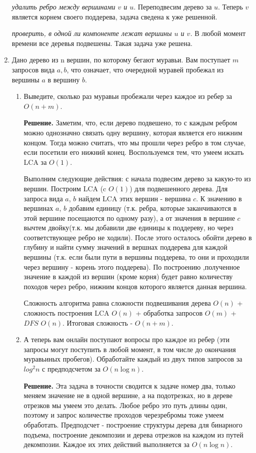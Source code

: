 \begin{enumerate}
	\textit{удалить ребро между вершинами $v$ и $u$}. Переподвесим дерево за $u$. Теперь $v$ 
	является корнем своего поддерева, задача сведена к уже решенной.
	
	\textit{проверить, в одной ли компоненте лежат вершины $u$ и $v$.} В любой момент времени 
	все деревья подвешены. Такая задача уже решена.
	
	
	\item Дано дерево из n вершин, по которому бегают муравьи. Вам поступает $m$
	запросов вида $a, b$, что означает, что очередной муравей пробежал из вершины $a$ в вершину 
	$b$.
	
	\begin{enumerate}
		\item Выведите, сколько раз муравьи пробежали через каждое из ребер за $O(n + m)$.
		
		\textbf{Решение. } Заметим, что, если дерево подвешено, то с каждым ребром можно 
		однозначно связать одну вершину, которая является его нижним концом. Тогда можно 
		считать, что мы прошли через ребро в том случае, если посетили его нижний конец. 
		Воспользуемся тем, что умеем искать LCA за $O(1)$. 
		
		Выполним следующие действия: с начала подвесим дерево за какую-то из вершин. Построим 
		LCA (c $O(1)$) для подвешенного дерева. Для запроса вида $a$, $b$ найдем LCA этих 
		вершин - вершина $c$. К значению в вершинах $a$, $b$ добавим единицу (т.к. ребра, 
		которые заканчиваются в этой вершине посещаются по одному разу), а от значения в 
		вершине $c$ вычтем двойку(т.к. мы добавили две единицы к поддереву, но через 
		соответствующее ребро не ходили). После этого осталось обойти дерево в глубину и найти 
		сумму значений в вершнах поддерева для каждой вершины (т.к. если были пути в вершины 
		поддерева, то они и проходили через вершину - корень этого поддерева). По построению 
		,полученное значение в каждой из вершин (кроме корня) будет равно количеству походов 
		через ребро, 
		нижним концов которого является данная вершина.
		
		Сложность алгоритма равна сложности подвешивания дерева $O(n)$ + сложность построения 
		LCA $O(n)$ + обработка запросов $O(m)$ + $DFS$ $O(n)$. Итоговая сложность - $O(n + m)$.
	
		\item А теперь вам онлайн поступают вопросы про каждое из ребер (эти запросы могут 
		поступить в любой момент, в том числе до окончания муравьиных пробегов). Обработайте 
		каждый из двух типов запросов за $log^2 n$ с предподсчетом за $O(n \log n)$.
		
		\textbf{Решение. } Эта задача в точности сводится к задаче номер два, только меняем 
		значение не в одной вершине, а на подотрезках, но в дереве отрезков мы умеем это делать. 
		Любое ребро это путь длины один, поэтому и запрос количестве проходов черезребромы тоже 
		умеем обработать. Предподсчет - построение структуры дерева для бинарного подъема, 
		построение декомпозии и дерева отрезков на каждом из путей декомпозии. Каждое их этих 
		действий выполняется за $O(n \log n)$. 
	\end{enumerate}
		
		
\end{enumerate}


